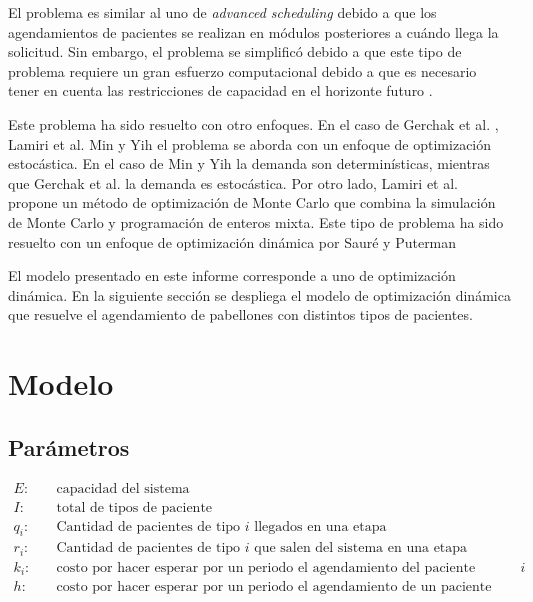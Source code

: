 \documentclass[letterpaper,10pt]{article}
\begin{document}
El problema es similar al uno de 
\textit{advanced scheduling} debido a que los agendamientos de pacientes se realizan en módulos posteriores a cuándo llega la solicitud. Sin embargo, el problema se simplificó debido a que este tipo de problema requiere un gran esfuerzo computacional debido a que es necesario tener en cuenta las restricciones de capacidad en el horizonte futuro \cite{Yasin}.

Este problema ha sido resuelto con otro enfoques. En el caso de Gerchak et al. \cite{Gerchak}, Lamiri et al. \cite{Lamiri} Min y Yih \cite{Min} el problema se aborda con un enfoque de optimización estocástica. En el caso de Min y Yih \cite{Min} la demanda son determinísticas, mientras que Gerchak et al. la demanda es estocástica. Por otro lado, Lamiri et al. propone un método de optimización de Monte Carlo que combina la simulación de Monte Carlo y programación de enteros mixta. Este tipo de problema ha sido resuelto con un enfoque de optimización dinámica por Sauré y Puterman \cite{saure17}

El modelo presentado en este informe corresponde a uno de optimización dinámica. En la siguiente sección se despliega el modelo de optimización dinámica que resuelve el agendamiento de pabellones con distintos tipos de pacientes.

\section*{Modelo}

\subsection*{Parámetros}

    \begin{align*}
        E: & \quad \text{capacidad del sistema} \\
        I: & \quad \text{total de tipos de paciente}\\ 
        q_{i}: &\quad \text{Cantidad de pacientes de tipo $i$ llegados en una etapa} \\
        r_{i}: &\quad \text{Cantidad de pacientes de tipo $i$ que salen del sistema en una etapa} \\
        k_{i}: & \quad \text{costo por hacer esperar por un periodo el agendamiento del paciente urgente de tipo $i$} \\
        h: & \quad \text{costo por hacer esperar por un periodo el agendamiento de un  paciente} \\
    \end{align*}
    
\end{document}
